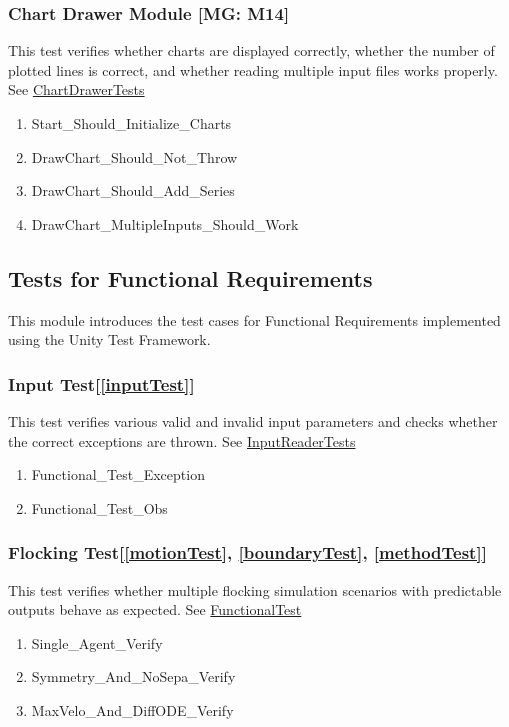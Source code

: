 \documentclass[12pt, titlepage]{article}
\begin{document}
\subsubsection{Chart Drawer Module [MG: M14]} \label{UTChart}

This test verifies whether charts are displayed correctly, whether the number 
of plotted lines is correct, and whether reading multiple input files works 
properly.
See \href{https://github.com/Mei0725/FlockingSimulator/blob/main/src/Assets/Tests/Visualization/ChartDrawerTests.cs}{ChartDrawerTests}
\begin{enumerate}
  \item Start\_Should\_Initialize\_Charts
  \item DrawChart\_Should\_Not\_Throw
  \item DrawChart\_Should\_Add\_Series
  \item DrawChart\_MultipleInputs\_Should\_Work
\end{enumerate}

\subsection{Tests for Functional Requirements}

This module introduces the test cases for Functional Requirements implemented 
using the Unity Test Framework.

\subsubsection{Input Test[\ref{inputTest}]} \label{FTInput}

This test verifies various valid and invalid input parameters and checks 
whether the correct exceptions are thrown.
See \href{https://github.com/Mei0725/FlockingSimulator/blob/main/src/Assets/Tests/IO/InputReaderTests.cs}{InputReaderTests}
\begin{enumerate}
  \item Functional\_Test\_Exception
  \item Functional\_Test\_Obs
\end{enumerate}

\subsubsection{Flocking Test[\ref{motionTest}, \ref{boundaryTest}, \ref{methodTest}]} \label{FTFlocking}

This test verifies whether multiple flocking simulation scenarios with 
predictable outputs behave as expected.
See \href{https://github.com/Mei0725/FlockingSimulator/blob/main/src/Assets/Tests/FunctionalTest/FunctionalTest.cs}{FunctionalTest}
\begin{enumerate}
  \item Single\_Agent\_Verify
  \item Symmetry\_And\_NoSepa\_Verify
  \item MaxVelo\_And\_DiffODE\_Verify
\end{enumerate}
\end{document}
